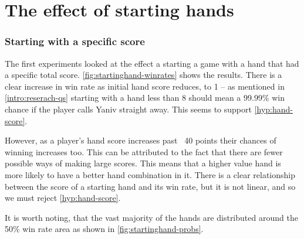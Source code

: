 \documentclass[../main.tex]{subfiles}
\begin{document}

\section{The effect of starting hands}
\subsubsection{Starting with a specific score}
The first experiments looked at the effect a starting a game with a hand that had a specific total score. \cref{fig:startinghand-winrates} shows the results. There is a clear increase in win rate as initial hand score reduces, to 1 -- as mentioned in \cref{intro:reserach-qs} starting with a hand less than 8 should mean a 99.99\% win chance if the player calls Yaniv straight away. This seems to support \cref{hyp:hand-score}. 

However, as a player's hand score increases past ~40 points their chances of winning increases too. This can be attributed to the fact that there are fewer possible ways of making large scores. This means that a higher value hand is more likely to have a better hand combination in it. There is a clear relationship between the score of a starting hand and its win rate, but it is not linear, and so we must reject \cref{hyp:hand-score}. 

It is worth noting, that the vast majority of the hands are distributed around the 50\% win rate area as shown in \cref{fig:startinghand-probs}. 
\end{document}
